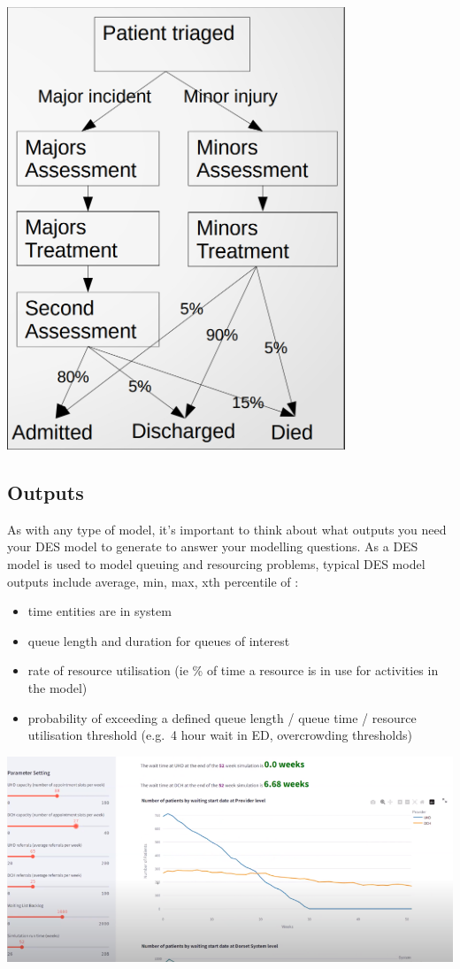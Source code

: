 \documentclass[
  letterpaper,
  DIV=11,
  numbers=noendperiod]{scrreprt}
\providecommand{\tightlist}{%
  \setlength{\itemsep}{0pt}\setlength{\parskip}{0pt}}\usepackage{longtable,booktabs,array}
\begin{document}
\includegraphics{images/branching_paths_simple.png}

\subsection{Outputs}\label{outputs}

As with any type of model, it's important to think about what outputs
you need your DES model to generate to answer your modelling questions.
As a DES model is used to model queuing and resourcing problems, typical
DES model outputs include average, min, max, xth percentile of :

\begin{itemize}
\tightlist
\item
  time entities are in system
\item
  queue length and duration for queues of interest
\item
  rate of resource utilisation (ie \% of time a resource is in use for
  activities in the model)
\item
  probability of exceeding a defined queue length / queue time /
  resource utilisation threshold (e.g.~4 hour wait in ED, overcrowding
  thresholds)
\end{itemize}

\includegraphics{images/output_example_simple.png}
\end{document}
